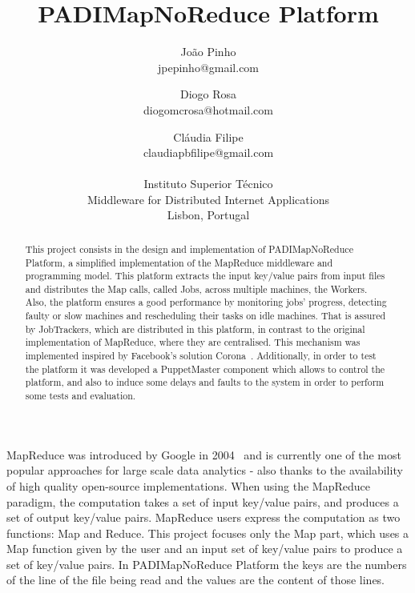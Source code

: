 \documentclass[times, 10pt,twocolumn]{article}
\begin{document}
	
	\title{PADIMapNoReduce Platform}
	
	\author{João Pinho\\jpepinho@gmail.com
		\and Diogo Rosa\\diogomcrosa@hotmail.com
		\and Cláudia Filipe\\claudiapbfilipe@gmail.com\\\\		 
		Instituto Superior Técnico\\ Middleware for Distributed Internet Applications \\ Lisbon, Portugal}
	\maketitle
	\thispagestyle{empty}
	
	\begin{abstract}
		This project consists in the design and implementation of PADIMapNoReduce Platform, a simplified implementation of the MapReduce middleware and programming model. This platform extracts the input key/value pairs from input files and distributes the Map calls, called Jobs, across multiple machines, the Workers. 
		Also, the platform ensures a good performance by monitoring jobs’ progress, detecting faulty or slow machines and rescheduling their tasks on idle machines. That is assured by JobTrackers, which are distributed in this platform, in contrast to the original implementation of MapReduce, where they are centralised. This mechanism was implemented inspired by Facebook's solution Corona~\cite{ex1}. 
		Additionally, in order to test the platform it was developed a PuppetMaster component which allows to control the platform, and also to induce some delays and faults to the system in order	to perform some tests and evaluation.
	\end{abstract}
	MapReduce was introduced by Google in 2004~\cite{ex2} and is currently one of the most popular approaches for large scale data analytics - also thanks to the availability of high quality open-source implementations. When using the MapReduce paradigm, the computation takes a set of input key/value pairs, and produces a set of output key/value pairs. MapReduce users express the computation as two functions: Map and Reduce. 
	This project focuses only the Map part, which uses a Map function given by the user and an input set of key/value pairs to produce a set of key/value pairs. 
	In PADIMapNoReduce Platform the keys are the numbers of the line of the file being read and the values are the content of those lines.
	
\end{document}
